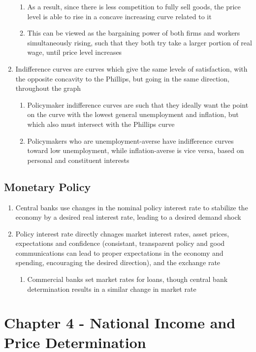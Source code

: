\documentclass[11 pt, twoside]{article}
\begin{document}
\begin{enumerate}
\begin{enumerate}
\item As a result, since there is less competition to fully sell goods, the price level is able to rise in a concave increasing curve related to it
\item This can be viewed as the bargaining power of both firms and workers simultaneously rising, such that they both try take a larger portion of real wage, until price level increases
\end{enumerate}
\item Indifference curves are curves which give the same levels of satisfaction, with the opposite concavity to the Phillips, but going in the same direction, throughout the graph
\begin{enumerate}
\item Policymaker indifference curves are such that they ideally want the point on the curve with the lowest general unemployment and inflation, but which also must intersect with the Phillips curve
\item Policymakers who are unemployment-averse have indifference curves toward low unemployment, while inflation-averse is vice versa, based on personal and constituent interests
\end{enumerate}
\end{enumerate}

\subsection{Monetary Policy}
\begin{enumerate}
\item Central banks use changes in the nominal policy interest rate to stabilize the economy by a desired real interest rate, leading to a desired demand shock
\item Policy interest rate directly chnages market interest rates, asset prices, expectations and confidence (consistant, transparent policy and good communications can lead to proper expectations in the economy and spending, encouraging the desired direction), and the exchange rate
\begin{enumerate}
\item Commercial banks set market rates for loans, though central bank determination results in a similar change in market rate
\end{enumerate}
\end{enumerate}



\section{Chapter 4 - National Income and Price Determination}
\end{document}
